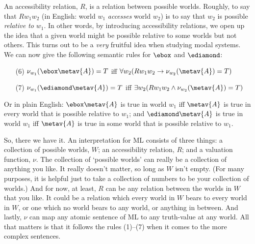 An accessibility relation, $R$, is a relation between possible worlds. Roughly, to say that $Rw_1w_2$ (in English: world $w_1$ \emph{accesses} world $w_2$) is to say that $w_2$ is possible \emph{relative to} $w_1$. In other words, by introducing accessibility relations, we open up the idea that a given world might be possible relative to some worlds but not others. This turns out to be a \emph{very} fruitful idea when studying modal systems. We can now give the following semantic rules for $\ebox$ and $\ediamond$:
\begin{itemize}
	\item[(6)]$\nu_{w_1}(\ebox \metav{A})=T$ iff $\forall w_2 (Rw_1w_2\eif \nu_{w_2}(\metav{A})=T)$
	\item[(7)]$\nu_{w_1}(\ediamond \metav{A})=T$ iff $\exists w_2 (Rw_1w_2\eand \nu_{w_2}(\metav{A})=T)$
\end{itemize}
Or in plain English: $\ebox\metav{A}$ is true in world $w_1$ iff $\metav{A}$ is true in every world that is possible relative to $w_1$; and $\ediamond\metav{A}$ is true in world $w_1$ iff $\metav{A}$ is true in some world that is possible relative to $w_1$.

So, there we have it. An interpretation for ML consists of three things: a collection of possible worlds, $W$; an accessibility relation, $R$; and a valuation function, $\nu$. The collection of `possible worlds' can really be a collection of anything you like. It really doesn't matter, so long as $W$ isn't empty. (For many purposes, it is helpful just to take a collection of numbers to be your collection of worlds.) And for now, at least, $R$ can be any relation between the worlds in $W$ that you like. It could be a relation which every world in $W$ bears to every world in $W$, or one which no world bears to any world, or anything in between. And lastly, $\nu$ can map any atomic sentence of ML to any truth-value at any world. All that matters is that it follows the rules (1)--(7) when it comes to the more complex sentences.

